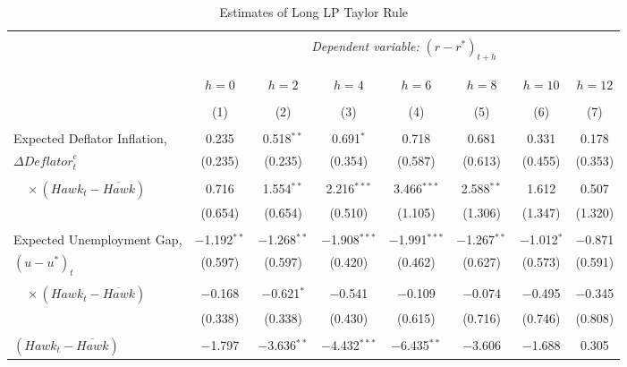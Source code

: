 \documentclass[11pt]{article}
\begin{document}
  \begin{table}[!htbp] \centering \scriptsize
    \begin{threeparttable}
    \caption{Estimates of Long LP Taylor Rule} 
    \label{} 
  \begin{tabular}{@{\extracolsep{5pt}}lccccccc} 
  \\[-1.8ex]\hline 
  \hline \\[-1.8ex] 
  & \multicolumn{7}{c}{\textit{Dependent variable:} $\left(r-r^*\right)_{t+h}$} \\ \\[-1.8ex] 
  \cline{2-8} 
  \\[-1.8ex] & $h=0$ & $h=2$ & $h=4$ & $h=6$ & $h=8$ & $h=10$ & $h=12$ \\ 
  \\[-1.8ex] & (1) & (2) & (3) & (4) & (5) & (6) & (7)\\ 
  \hline \\[-1.8ex] 
  Expected Deflator Inflation,  & 0.235 & 0.518$^{**}$ & 0.691$^{*}$ & 0.718 & 0.681 & 0.331 & 0.178 \\ 
  $\Delta\mathit{Deflator}_t^e$ & (0.235) & (0.235) & (0.354) & (0.587) & (0.613) & (0.455) & (0.353) \\ 
    & & & & & & & \\ 
   $\quad \times \left(\mathit{Hawk}_t-\overline{\mathit{Hawk}}\right)$ & 0.716 & 1.554$^{**}$ & 2.216$^{***}$ & 3.466$^{***}$ & 2.588$^{**}$ & 1.612 & 0.507 \\ 
    & (0.654) & (0.654) & (0.510) & (1.105) & (1.306) & (1.347) & (1.320) \\ 
    & & & & & & & \\ 
   Expected Unemployment Gap, & $-$1.192$^{**}$ & $-$1.268$^{**}$ & $-$1.908$^{***}$ & $-$1.991$^{***}$ & $-$1.267$^{**}$ & $-$1.012$^{*}$ & $-$0.871 \\ 
    $\left(u-u^*\right)_t$ & (0.597) & (0.597) & (0.420) & (0.462) & (0.627) & (0.573) & (0.591) \\ 
    & & & & & & & \\ 
    $\quad \times \left(\mathit{Hawk}_t-\overline{\mathit{Hawk}}\right)$& $-$0.168 & $-$0.621$^{*}$ & $-$0.541 & $-$0.109 & $-$0.074 & $-$0.495 & $-$0.345 \\ 
    & (0.338) & (0.338) & (0.430) & (0.615) & (0.716) & (0.746) & (0.808) \\ 
    & & & & & & & \\ 
    $\left(\mathit{Hawk}_t-\overline{\mathit{Hawk}}\right)$ & $-$1.797 & $-$3.636$^{**}$ & $-$4.432$^{***}$ & $-$6.435$^{**}$ & $-$3.606 & $-$1.688 & 0.305 \\ 

\end{tabular}
\end{threeparttable}
\end{table}
\end{document}
